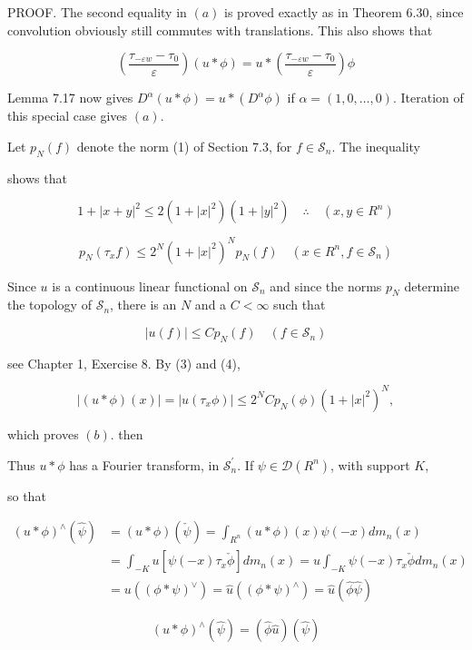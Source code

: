 \documentclass[10pt]{article}
\begin{document}
PROOF. The second equality in $(a)$ is proved exactly as in Theorem 6.30, since convolution obviously still commutes with translations. This also shows that

$$
\left(\frac{\tau_{-\varepsilon w}-\tau_{0}}{\varepsilon}\right)(u * \phi)=u *\left(\frac{\tau_{-\varepsilon w}-\tau_{0}}{\varepsilon}\right) \phi
$$

Lemma 7.17 now gives $D^{\alpha}(u * \phi)=u *\left(D^{\alpha} \phi\right)$ if $\alpha=(1,0, \ldots, 0)$. Iteration of this special case gives $(a)$.

Let $p_{N}(f)$ denote the norm (1) of Section 7.3, for $f \in \mathscr{S}_{n}$. The inequality

shows that

$$
1+|x+y|^{2} \leq 2\left(1+|x|^{2}\right)\left(1+|y|^{2}\right) \quad \therefore \quad\left(x, y \in R^{n}\right)
$$

$$
p_{N}\left(\tau_{x} f\right) \leq 2^{N}\left(1+|x|^{2}\right)^{N} p_{N}(f) \quad\left(x \in R^{n}, f \in \mathscr{S}_{n}\right)
$$

Since $u$ is a continuous linear functional on $\mathscr{S}_{n}$ and since the norms $p_{N}$ determine the topology of $\mathscr{S}_{n}$, there is an $N$ and a $C<\infty$ such that

$$
|u(f)| \leq C p_{N}(f) \quad\left(f \in \mathscr{S}_{n}\right)
$$

see Chapter 1, Exercise 8. By (3) and (4),

$$
|(u * \phi)(x)|=\left|u\left(\tau_{x} \phi\right)\right| \leq 2^{N} C p_{N}(\phi)\left(1+|x|^{2}\right)^{N},
$$

which proves $(b)$. then

Thus $u * \phi$ has a Fourier transform, in $\mathscr{S}_{n}^{\prime}$. If $\psi \in \mathscr{D}\left(R^{n}\right)$, with support $K$,

so that

$$
\begin{aligned}
(u * \phi)^{\wedge}(\hat{\psi}) & =(u * \phi)(\check{\psi})=\int_{R^{n}}(u * \phi)(x) \psi(-x) d m_{n}(x) \\
& =\int_{-K} u\left[\psi(-x) \tau_{x} \check{\phi}\right] d m_{n}(x)=u \int_{-K} \psi(-x) \tau_{x} \check{\phi} d m_{n}(x) \\
& =u\left((\phi * \psi)^{\vee}\right)=\hat{u}\left((\phi * \psi)^{\wedge}\right)=\hat{u}(\hat{\phi} \hat{\psi})
\end{aligned}
$$

$$
(u * \phi)^{\wedge}(\hat{\psi})=(\hat{\phi} \hat{u})(\hat{\psi})
$$
\end{document}
